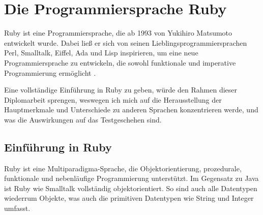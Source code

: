 \section{Die Programmiersprache Ruby}

Ruby ist eine Programmiersprache, die ab 1993 von Yukihiro Matsumoto entwickelt wurde. Dabei ließ er sich von seinen Lieblingsprogrammiersprachen Perl, Smalltalk, Eiffel, Ada und Lisp inspirieren, um eine neue Programmiersprache zu entwickeln, die sowohl funktionale und imperative Programmierung ermöglicht \citep{ruby_visual_identity_team_about_2011}. 

Eine vollständige Einführung in Ruby zu geben, würde den Rahmen dieser Diplomarbeit sprengen, weswegen ich mich auf die Herausstellung der Hauptmerkmale und Unterschiede zu anderen Sprachen konzentrieren werde, und was die Auswirkungen auf das Testgeschehen sind.


\subsection{Einführung in Ruby}
Ruby ist eine Multiparadigma-Sprache, die Objektorientierung, prozedurale, funktionale und nebenläufige Programmierung unterstützt. Im Gegensatz zu Java ist Ruby wie Smalltalk vollständig objektorientiert. So sind auch alle Datentypen wiederrum Objekte, was auch die primitiven Datentypen wie String und Integer umfasst. 

